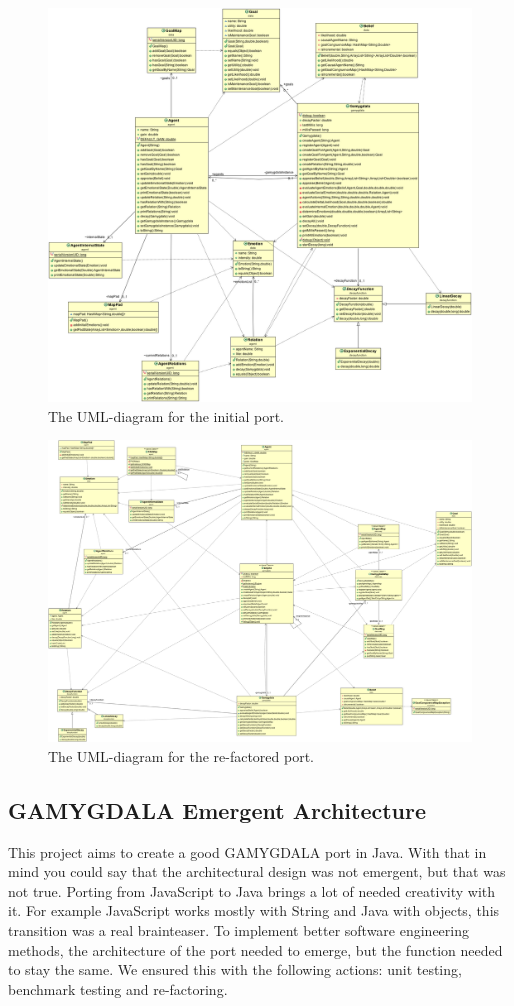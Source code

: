 \begin{figure}
\includegraphics[width=\linewidth]{GAMYGDALA_UML_OLD}
\caption{The UML-diagram for the initial port.}
\end{figure}

\begin{figure}
\includegraphics[width=\linewidth]{GAMYGDALA_UML_NEW}
\caption{The UML-diagram for the re-factored port.}
\end{figure}

\subsection{GAMYGDALA Emergent Architecture}
This project aims to create a good GAMYGDALA port in Java. With that in mind you could say that the architectural design was not emergent, but that was not true. Porting from JavaScript to Java brings a lot of needed creativity with it. For example JavaScript works mostly with String and Java with objects, this transition was a real brainteaser. To implement better software engineering methods, the architecture of the port needed to emerge, but the function needed to stay the same. We ensured this with the following actions: unit testing, benchmark testing and re-factoring. 

